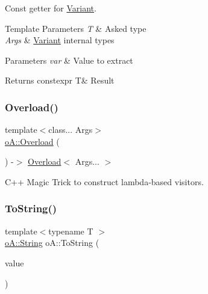 Const getter for \mbox{\hyperlink{namespaceo_a_a46a1498e4e673b19327a24fac0018867}{Variant}}. 


\begin{DoxyTemplParams}{Template Parameters}
{\em T} & Asked type \\
\hline
{\em Args} & \mbox{\hyperlink{namespaceo_a_a46a1498e4e673b19327a24fac0018867}{Variant}} internal types \\
\hline
\end{DoxyTemplParams}

\begin{DoxyParams}{Parameters}
{\em var} & Value to extract \\
\hline
\end{DoxyParams}
\begin{DoxyReturn}{Returns}
constexpr T\& Result 
\end{DoxyReturn}
\mbox{\label{namespaceo_a_a503e8d88dbf13dedc19801dafc632979}} 
\subsubsection{\texorpdfstring{Overload()}{Overload()}}
{\footnotesize\ttfamily template$<$class... Args$>$ \\
\mbox{\hyperlink{structo_a_1_1_overload}{o\+A\+::\+Overload}} (\begin{DoxyParamCaption}\item[{Args...}]{ }\end{DoxyParamCaption}) -\/$>$  \mbox{\hyperlink{structo_a_1_1_overload}{Overload}}$<$ Args... $>$}



C++ Magic Trick to construct lambda-\/based visitors. 

\mbox{\label{namespaceo_a_ab2db5fe904e4be44ffb651930b97d482}} 
\subsubsection{\texorpdfstring{To\+String()}{ToString()}}
{\footnotesize\ttfamily template$<$typename T $>$ \\
\mbox{\hyperlink{classo_a_1_1_string}{o\+A\+::\+String}} o\+A\+::\+To\+String (\begin{DoxyParamCaption}\item[{T}]{value }\end{DoxyParamCaption})}



